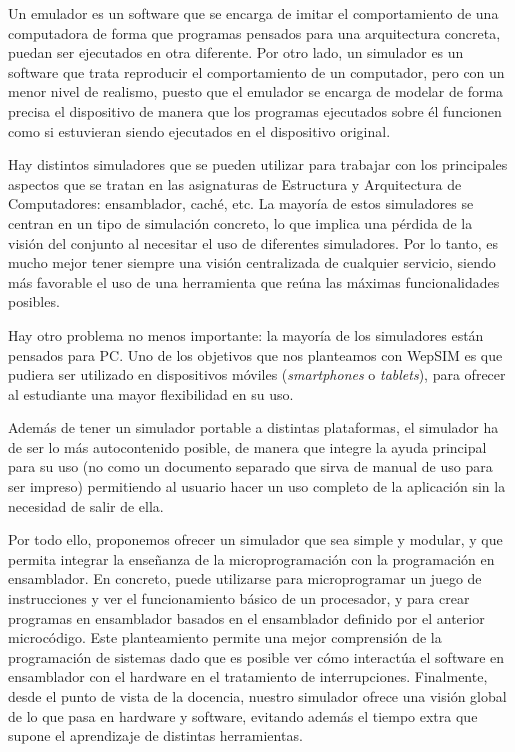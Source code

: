Un emulador es un software que se encarga de imitar el comportamiento de una computadora de forma que programas pensados para una arquitectura concreta, puedan ser ejecutados en otra diferente. Por otro lado, un simulador es un software que trata reproducir el comportamiento de un computador, pero con un menor nivel de realismo, puesto que el emulador se encarga de modelar de forma precisa el dispositivo de manera que los programas ejecutados sobre él funcionen como si estuvieran siendo ejecutados en el dispositivo original.

Hay distintos simuladores que se pueden utilizar para trabajar con los principales aspectos que se tratan en las asignaturas de Estructura y Arquitectura de Computadores: ensamblador, caché, etc. La mayoría de estos simuladores se centran en un tipo de simulación concreto, lo que implica una pérdida de la visión del conjunto al necesitar el uso de diferentes simuladores. Por lo tanto, es mucho mejor tener siempre una visión centralizada de cualquier servicio, siendo más favorable el uso de una herramienta que reúna las máximas funcionalidades posibles.

Hay otro problema no menos importante: la mayoría de los simuladores están pensados para PC. Uno de los objetivos que nos planteamos con WepSIM es que pudiera ser utilizado en dispositivos móviles (\emph{smartphones} o \emph{tablets}), para ofrecer al estudiante una mayor flexibilidad en su uso.

Además de tener un simulador portable a distintas plataformas, el simulador ha de ser lo más autocontenido posible, de manera que integre la ayuda principal para su uso (no como un documento separado que sirva de manual de uso para ser impreso) permitiendo al usuario hacer un uso completo de la aplicación sin la necesidad de salir de ella.

Por todo ello, proponemos ofrecer un simulador que sea simple y modular, y que permita integrar la enseñanza de la microprogramación con la programación en ensamblador. En concreto, puede utilizarse para microprogramar un juego de instrucciones y ver el funcionamiento básico de un procesador, y para crear programas en ensamblador basados en el ensamblador definido por el anterior microcódigo. Este planteamiento permite una mejor comprensión de la programación de sistemas dado que es posible ver cómo interactúa el software en ensamblador con el hardware en el tratamiento de interrupciones. Finalmente, desde el punto de vista de la docencia, nuestro simulador ofrece una visión global de lo que pasa en hardware y software, evitando además el tiempo extra que supone el aprendizaje de distintas herramientas.


